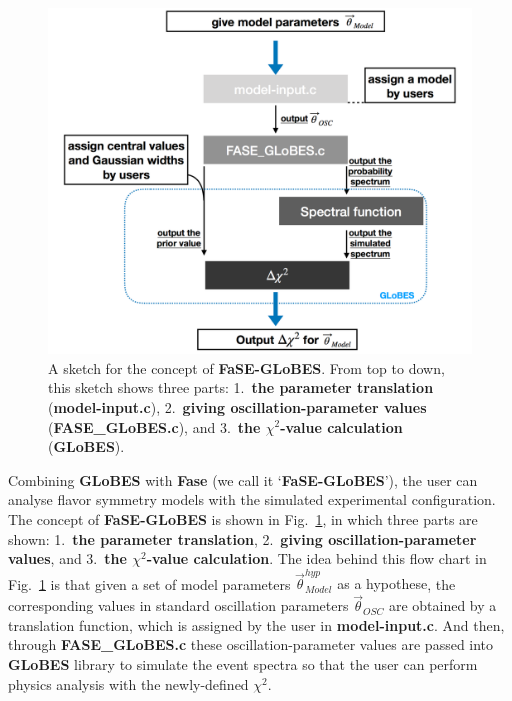 \documentclass[aps,prd,nofootinbib,preprint]{revtex4}
\begin{document}
\begin{figure}[!h]%
\centering
\includegraphics[width=5in]{Figs/FASE-chart_1_2.pdf}
\caption{%
{\color{blue}A sketch for the concept of \textbf{FaSE-GLoBES}. From top to down, this sketch shows three parts: 1.~\textbf{the parameter translation} (\textbf{model-input.c}), 2.~\textbf{giving oscillation-parameter values} (\textbf{FASE\_GLoBES.c}), and 3.~\textbf{the $\chi^2$-value calculation} (\textbf{GLoBES}).}
}%
\label{fig:FASE}
\end{figure}

{\color{blue}Combining \textbf{GLoBES} with \textbf{Fase} (we call it `\textbf{FaSE-GLoBES}'),  the user can analyse flavor symmetry models with the simulated experimental configuration.} The concept of \textbf{FaSE-GLoBES} is shown in Fig.~\ref{fig:FASE}, in which three parts are shown: 1.~\textbf{the parameter translation}, 2.~\textbf{giving oscillation-parameter values}, and 3.~\textbf{the $\chi^2$-value calculation}. 
%
The idea behind this flow chart in Fig.~\ref{fig:FASE} is that given a set of model parameters {\color{blue}$\vec{\theta}^{hyp}_{Model}$ as a hypothese}, the corresponding values in standard oscillation parameters $\vec{\theta}_{OSC}$ are obtained by a translation function, which is assigned by the user in \textbf{model-input.c}. And then, through \textbf{FASE\_GLoBES.c} these oscillation-parameter values are passed into \textbf{GLoBES} library to simulate the event spectra so that {\color{blue}the user} can perform physics analysis {\color{blue}with} the newly-defined $\chi^2$. 
\end{document}
